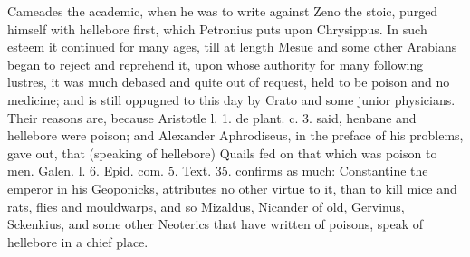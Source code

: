 {Cameades the academic, when he was to write against Zeno the stoic,
purged himself with hellebore first, which Petronius puts upon
Chrysippus. In such esteem it continued for many ages, till at length
Mesue and some other Arabians began to reject and reprehend it, upon
whose authority for many following lustres, it was much debased and
quite out of request, held to be poison and no medicine; and is still
oppugned to this day by  Crato and some junior physicians. Their
reasons are, because Aristotle l. 1. de plant. c. 3. said, henbane and
hellebore were poison; and Alexander Aphrodiseus, in the preface of his
problems, gave out, that (speaking of hellebore) Quails fed on
that which was poison to men. Galen. l. 6. Epid. com. 5. Text. 35.
confirms as much: Constantine the emperor in his Geoponicks,
attributes no other virtue to it, than to kill mice and rats, flies and
mouldwarps, and so Mizaldus, Nicander of old, Gervinus, Sckenkius, and
some other Neoterics that have written of poisons, speak of hellebore
in a chief place. 

}
